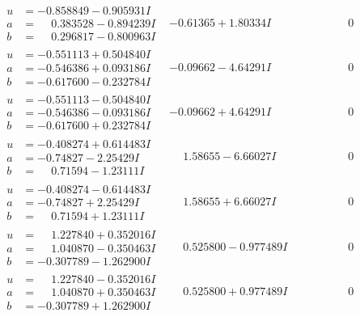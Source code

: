 \documentclass[1p]{elsarticle_modified}
\theoremstyle{definition}
\begin{document}
$$\begin{array}{c|c|c}
\begin{aligned}
u &= -0.858849 - 0.905931 I \\
a &= \phantom{-}0.383528 - 0.894239 I \\
b &= \phantom{-}0.296817 - 0.800963 I\end{aligned}
 & -0.61365 + 1.80334 I & \phantom{-0.000000 } 0 \\ \hline\begin{aligned}
u &= -0.551113 + 0.504840 I \\
a &= -0.546386 + 0.093186 I \\
b &= -0.617600 - 0.232784 I\end{aligned}
 & -0.09662 - 4.64291 I & \phantom{-0.000000 } 0 \\ \hline\begin{aligned}
u &= -0.551113 - 0.504840 I \\
a &= -0.546386 - 0.093186 I \\
b &= -0.617600 + 0.232784 I\end{aligned}
 & -0.09662 + 4.64291 I & \phantom{-0.000000 } 0 \\ \hline\begin{aligned}
u &= -0.408274 + 0.614483 I \\
a &= -0.74827 - 2.25429 I \\
b &= \phantom{-}0.71594 - 1.23111 I\end{aligned}
 & \phantom{-}1.58655 - 6.66027 I & \phantom{-0.000000 } 0 \\ \hline\begin{aligned}
u &= -0.408274 - 0.614483 I \\
a &= -0.74827 + 2.25429 I \\
b &= \phantom{-}0.71594 + 1.23111 I\end{aligned}
 & \phantom{-}1.58655 + 6.66027 I & \phantom{-0.000000 } 0 \\ \hline\begin{aligned}
u &= \phantom{-}1.227840 + 0.352016 I \\
a &= \phantom{-}1.040870 - 0.350463 I \\
b &= -0.307789 - 1.262900 I\end{aligned}
 & \phantom{-}0.525800 - 0.977489 I & \phantom{-0.000000 } 0 \\ \hline\begin{aligned}
u &= \phantom{-}1.227840 - 0.352016 I \\
a &= \phantom{-}1.040870 + 0.350463 I \\
b &= -0.307789 + 1.262900 I\end{aligned}
 & \phantom{-}0.525800 + 0.977489 I & \phantom{-0.000000 } 0\\

\end{array}$$
\end{document}
